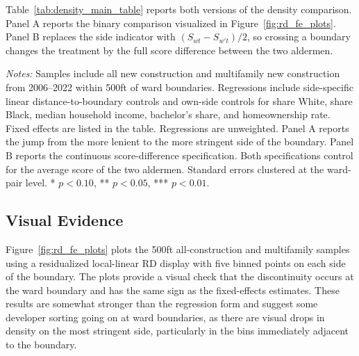 Table~\ref{tab:density_main_table} reports both versions of the density comparison.
Panel A reports the binary comparison visualized in Figure~\ref{fig:rd_fe_plots}.
Panel B replaces the side indicator with $(S_{wt}-S_{w't})/2$, so crossing a boundary changes the treatment by the full score difference between the two aldermen.

\begin{table}[htbp]
    \caption{Binary and Continuous Estimates of Development Density (500ft)}
    \label{tab:density_main_table}

    

    \footnotesize
    \textit{Notes:} Samples include all new construction and multifamily new construction from 2006--2022 within 500ft of ward boundaries.
    Regressions include side-specific linear distance-to-boundary controls and own-side controls for share White, share Black, median household income, bachelor's share, and homeownership rate.
    Fixed effects are listed in the table.
    Regressions are unweighted.
    Panel A reports the jump from the more lenient to the more stringent side of the boundary.
    Panel B reports the continuous score-difference specification.
    Both specifications control for the average score of the two aldermen.
    Standard errors clustered at the ward-pair level. * $p<0.10$, ** $p<0.05$, *** $p<0.01$.
\end{table}

\subsection{Visual Evidence}

Figure~\ref{fig:rd_fe_plots} plots the 500ft all-construction and multifamily samples using a residualized local-linear RD display with five binned points on each side of the boundary.
The plots provide a visual check that the discontinuity occurs at the ward boundary and has the same sign as the fixed-effects estimates.
These results are somewhat stronger than the regression form and suggest some developer sorting going on at ward boundaries, as there are visual drops in density on the most stringent side, particularly in the bins immediately adjacent to the boundary.


